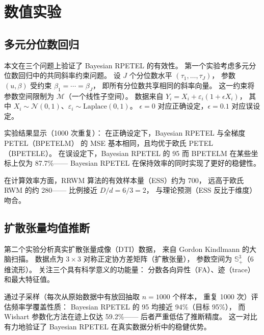\section{数值实验}\label{sec:ch1-experiments}

\subsection{多元分位数回归}\label{sec:ch1-quantile}

本文在三个问题上验证了 Bayesian RPETEL 的有效性。
第一个实验考虑多元分位数回归中的共同斜率约束问题。
设 $J$ 个分位数水平 $(\tau_1,\ldots,\tau_J)$，
参数 $(u,\beta)$ 受约束 $\beta_1=\cdots=\beta_J$，
即所有分位数共享相同的斜率向量。
这一约束将参数空间限制为 $\mathcal{M}$（一个线性子空间）。
数据来自 $Y_i=X_i+\varepsilon_i(1+\epsilon X_i)$，
其中 $X_i\sim\mathcal{N}(0,1)$、$\varepsilon_i\sim\mathrm{Laplace}(0,1)$。
$\epsilon=0$ 对应正确设定，$\epsilon=0.1$ 对应误设定。

实验结果显示（1000 次重复）：
在正确设定下，Bayesian RPETEL 与全梯度 PETEL（BPETELM）
的 MSE 基本相同，且均优于欧氏 PETEL（BPETELE）。
在误设定下，Bayesian RPETEL 的 95%
而 BPETELM 在某些坐标上仅为 87.7\%——
Bayesian RPETEL 在保持效率的同时实现了更好的稳健性。

在计算效率方面，RRWM 算法的有效样本量（ESS）约为 700，
远高于欧氏 RWM 的约 280——
比例接近 $D/d=6/3=2$，
与理论预测（ESS 反比于维度）吻合。

\subsection{扩散张量均值推断}\label{sec:ch1-diffusion}

第二个实验分析真实扩散张量成像（DTI）数据，
来自 Gordon Kindlmann 的大脑扫描。
数据点为 $3\times 3$ 对称正定协方差矩阵（扩散张量），
参数空间为 $\mathbb{S}_+^3$（6 维流形）。
关注三个具有科学意义的功能量：
分数各向异性（FA）、迹（trace）和最大特征值。

通过子采样（每次从原始数据中有放回抽取 $n=1000$ 个样本，
重复 1000 次）评估频率学覆盖性质：
Bayesian RPETEL 的 95%
均接近 94\%（目标 95\%），
而 Wishart 参数化方法在迹上仅达 59.2\%——
后者严重低估了推断精度。
这一对比有力地验证了 Bayesian RPETEL
在真实数据分析中的稳健优势。

